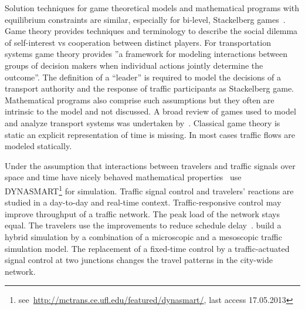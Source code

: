 Solution techniques for game theoretical models and mathematical programs with equilibrium constraints are similar, especially for bi-level, Stackelberg games~\citep{Hollander2006NonCooperativeGamesTransport}. 
Game theory provides techniques and terminology to describe the social dilemma of self-interest vs cooperation between distinct players. 
For transportation systems game theory provides ''a framework for modeling interactions between groups of decision makers when individual actions jointly determine the outcome''\citep{Fisk1984GameTheoryTransportationSystems}. 
The definition of a ``leader'' is required to model the decisions of a transport authority and the response of traffic participants as Stackelberg game. 
%
Mathematical programs also comprise such assumptions but they often are intrinsic to the model and not discussed. 
%
A broad review of games used to model and analyze transport systems was undertaken by~\citet{Hollander2006NonCooperativeGamesTransport}. 
Classical game theory is static an explicit representation of time is missing. 
In most cases traffic flows are modeled statically. 

Under the assumption that interactions between travelers and traffic signals over space and time have nicely behaved mathematical properties~\citet{Hu1997D2DFlowEvolutionReactiveSignalsDynasmart} use DYNASMART\footnote{see~\url{http://mctrans.ce.ufl.edu/featured/dynasmart/}, last access 17.05.2013} for simulation. 
Traffic signal control and travelers' reactions are studied in a day-to-day and real-time context. 
Traffic-responsive control may improve throughput of a traffic network. 
The peak load of the network stays equal. 
The travelers use the improvements to reduce schedule delay~\citep{Hu1997D2DFlowEvolutionReactiveSignalsDynasmart}. 
\citet{Burghout2007HybridSimulationAdaptiveSignal} build a hybrid simulation by a combination of a microscopic and a mesoscopic traffic simulation model. 
The replacement of a fixed-time control by a traffic-actuated signal control at two junctions changes the travel patterns in the city-wide network. 

